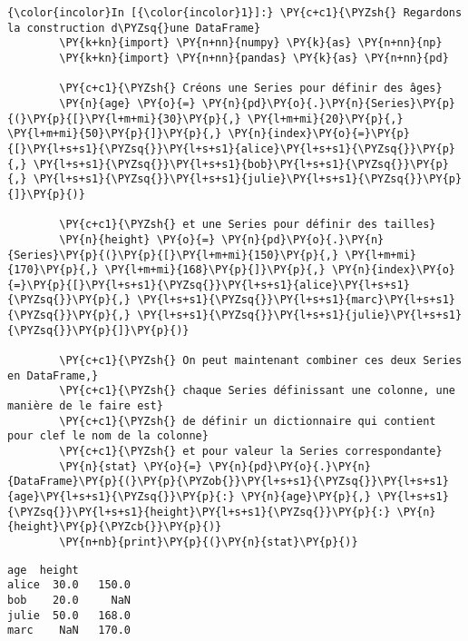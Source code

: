     \begin{Verbatim}[commandchars=\\\{\}]
{\color{incolor}In [{\color{incolor}1}]:} \PY{c+c1}{\PYZsh{} Regardons la construction d\PYZsq{}une DataFrame}
        \PY{k+kn}{import} \PY{n+nn}{numpy} \PY{k}{as} \PY{n+nn}{np}
        \PY{k+kn}{import} \PY{n+nn}{pandas} \PY{k}{as} \PY{n+nn}{pd}
        
        \PY{c+c1}{\PYZsh{} Créons une Series pour définir des âges}
        \PY{n}{age} \PY{o}{=} \PY{n}{pd}\PY{o}{.}\PY{n}{Series}\PY{p}{(}\PY{p}{[}\PY{l+m+mi}{30}\PY{p}{,} \PY{l+m+mi}{20}\PY{p}{,} \PY{l+m+mi}{50}\PY{p}{]}\PY{p}{,} \PY{n}{index}\PY{o}{=}\PY{p}{[}\PY{l+s+s1}{\PYZsq{}}\PY{l+s+s1}{alice}\PY{l+s+s1}{\PYZsq{}}\PY{p}{,} \PY{l+s+s1}{\PYZsq{}}\PY{l+s+s1}{bob}\PY{l+s+s1}{\PYZsq{}}\PY{p}{,} \PY{l+s+s1}{\PYZsq{}}\PY{l+s+s1}{julie}\PY{l+s+s1}{\PYZsq{}}\PY{p}{]}\PY{p}{)}
        
        \PY{c+c1}{\PYZsh{} et une Series pour définir des tailles}
        \PY{n}{height} \PY{o}{=} \PY{n}{pd}\PY{o}{.}\PY{n}{Series}\PY{p}{(}\PY{p}{[}\PY{l+m+mi}{150}\PY{p}{,} \PY{l+m+mi}{170}\PY{p}{,} \PY{l+m+mi}{168}\PY{p}{]}\PY{p}{,} \PY{n}{index}\PY{o}{=}\PY{p}{[}\PY{l+s+s1}{\PYZsq{}}\PY{l+s+s1}{alice}\PY{l+s+s1}{\PYZsq{}}\PY{p}{,} \PY{l+s+s1}{\PYZsq{}}\PY{l+s+s1}{marc}\PY{l+s+s1}{\PYZsq{}}\PY{p}{,} \PY{l+s+s1}{\PYZsq{}}\PY{l+s+s1}{julie}\PY{l+s+s1}{\PYZsq{}}\PY{p}{]}\PY{p}{)}
        
        \PY{c+c1}{\PYZsh{} On peut maintenant combiner ces deux Series en DataFrame,}
        \PY{c+c1}{\PYZsh{} chaque Series définissant une colonne, une manière de le faire est}
        \PY{c+c1}{\PYZsh{} de définir un dictionnaire qui contient pour clef le nom de la colonne}
        \PY{c+c1}{\PYZsh{} et pour valeur la Series correspondante}
        \PY{n}{stat} \PY{o}{=} \PY{n}{pd}\PY{o}{.}\PY{n}{DataFrame}\PY{p}{(}\PY{p}{\PYZob{}}\PY{l+s+s1}{\PYZsq{}}\PY{l+s+s1}{age}\PY{l+s+s1}{\PYZsq{}}\PY{p}{:} \PY{n}{age}\PY{p}{,} \PY{l+s+s1}{\PYZsq{}}\PY{l+s+s1}{height}\PY{l+s+s1}{\PYZsq{}}\PY{p}{:} \PY{n}{height}\PY{p}{\PYZcb{}}\PY{p}{)}
        \PY{n+nb}{print}\PY{p}{(}\PY{n}{stat}\PY{p}{)}
\end{Verbatim}


    \begin{Verbatim}[commandchars=\\\{\}]
        age  height
alice  30.0   150.0
bob    20.0     NaN
julie  50.0   168.0
marc    NaN   170.0

    \end{Verbatim}

